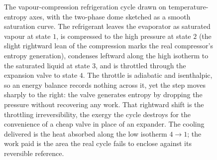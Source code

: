 \begin{figure}[htbp]
\caption[Refrigeration cycle on a temperature-entropy diagram]{The
vapour-compression refrigeration cycle drawn on temperature-entropy axes, with the
two-phase dome sketched as a smooth saturation curve. The refrigerant leaves the
evaporator as saturated vapour at state $1$, is compressed to the high pressure at
state $2$ (the slight rightward lean of the compression marks the real
compressor's entropy generation), condenses leftward along the high isotherm to
the saturated liquid at state $3$, and is throttled through the expansion valve to
state $4$. The throttle is adiabatic and isenthalpic, so an energy balance records
nothing across it, yet the step moves sharply to the right: the valve generates
entropy by dropping the pressure without recovering any work. That rightward shift
is the throttling irreversibility, the exergy the cycle destroys for the
convenience of a cheap valve in place of an expander. The cooling delivered is the
heat absorbed along the low isotherm $4\!\to\!1$; the work paid is the area the
real cycle fails to enclose against its reversible reference.}
\label{fig:vol04ch04:refrigeration-ts}
\end{figure}
